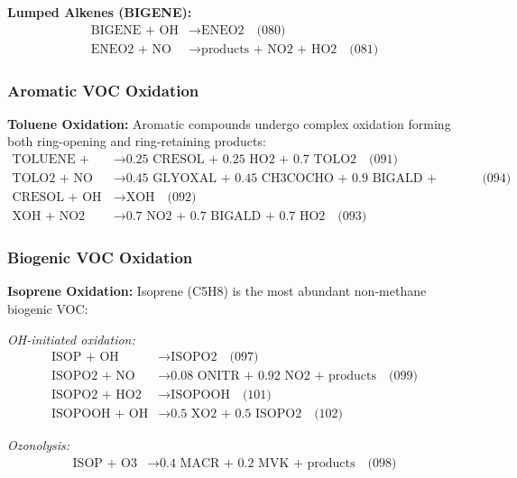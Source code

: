 \documentclass[12pt,a4paper]{article}
\begin{document}
\textbf{Lumped Alkenes (BIGENE):}
\begin{align}
\text{BIGENE + OH} &\rightarrow \text{ENEO2} \quad \text{(080)} \\
\text{ENEO2 + NO} &\rightarrow \text{products + NO2 + HO2} \quad \text{(081)}
\end{align}

\subsubsection{Aromatic VOC Oxidation}

\textbf{Toluene Oxidation:}
Aromatic compounds undergo complex oxidation forming both ring-opening and ring-retaining products:
\begin{align}
\text{TOLUENE + OH} &\rightarrow \text{0.25 CRESOL + 0.25 HO2 + 0.7 TOLO2} \quad \text{(091)} \\
\text{TOLO2 + NO} &\rightarrow \text{0.45 GLYOXAL + 0.45 CH3COCHO + 0.9 BIGALD + products} \quad \text{(094)} \\
\text{CRESOL + OH} &\rightarrow \text{XOH} \quad \text{(092)} \\
\text{XOH + NO2} &\rightarrow \text{0.7 NO2 + 0.7 BIGALD + 0.7 HO2} \quad \text{(093)}
\end{align}

\subsubsection{Biogenic VOC Oxidation}

\textbf{Isoprene Oxidation:}
Isoprene (C5H8) is the most abundant non-methane biogenic VOC:

\textit{OH-initiated oxidation:}
\begin{align}
\text{ISOP + OH} &\rightarrow \text{ISOPO2} \quad \text{(097)} \\
\text{ISOPO2 + NO} &\rightarrow \text{0.08 ONITR + 0.92 NO2 + products} \quad \text{(099)} \\
\text{ISOPO2 + HO2} &\rightarrow \text{ISOPOOH} \quad \text{(101)} \\
\text{ISOPOOH + OH} &\rightarrow \text{0.5 XO2 + 0.5 ISOPO2} \quad \text{(102)}
\end{align}

\textit{Ozonolysis:}
\begin{align}
\text{ISOP + O3} &\rightarrow \text{0.4 MACR + 0.2 MVK + products} \quad \text{(098)}
\end{align}
\end{document}
